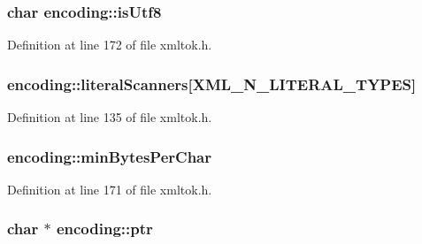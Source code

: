 \subsubsection[{\texorpdfstring{is\+Utf8}{isUtf8}}]{\setlength{\rightskip}{0pt plus 5cm}char encoding\+::is\+Utf8}\hypertarget{structencoding_a0d05507753831ee4427cd797668957bc}{}\label{structencoding_a0d05507753831ee4427cd797668957bc}


Definition at line 172 of file xmltok.\+h.

\subsubsection[{\texorpdfstring{literal\+Scanners}{literalScanners}}]{ encoding\+::literal\+Scanners\mbox{[}{\bf X\+M\+L\+\_\+\+N\+\_\+\+L\+I\+T\+E\+R\+A\+L\+\_\+\+T\+Y\+P\+ES}\mbox{]}}\hypertarget{structencoding_a6ad3e1bba280862459c4762dbb10f9e0}{}\label{structencoding_a6ad3e1bba280862459c4762dbb10f9e0}


Definition at line 135 of file xmltok.\+h.

\subsubsection[{\texorpdfstring{min\+Bytes\+Per\+Char}{minBytesPerChar}}]{ encoding\+::min\+Bytes\+Per\+Char}\hypertarget{structencoding_a8eb3388eddb82277ff63c992153f3595}{}\label{structencoding_a8eb3388eddb82277ff63c992153f3595}


Definition at line 171 of file xmltok.\+h.

\subsubsection[{\texorpdfstring{ptr}{ptr}}]{ char $\ast$ encoding\+::ptr}\hypertarget{structencoding_ad338493153641b08ca2220ba0518bdb3}{}\label{structencoding_ad338493153641b08ca2220ba0518bdb3}


